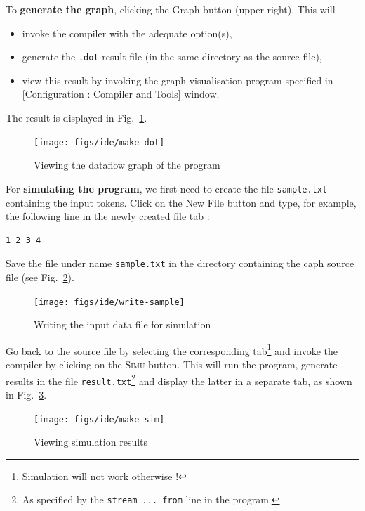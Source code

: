 \medskip
To \textbf{generate the graph}, clicking the \textsf{Graph} button (upper right). This will
\begin{itemize}
\item invoke the \caph compiler with the adequate option(s),
\item generate the \texttt{.dot} result file (in the same directory as the source file),
\item view this result by invoking the graph visualisation program specified in 
  [\textsf{Configuration : Compiler and Tools}] window.
\end{itemize}

The result is displayed in Fig.~\ref{fig:make-dot}.

\begin{figure}[h]
  \centering
  \texttt{[image: figs/ide/make-dot]}
  \caption{Viewing the dataflow graph of the program}
  \label{fig:make-dot}
\end{figure}

\medskip
For \textbf{simulating the program}, we first need to create the file \texttt{sample.txt} containing
the input tokens. Click on the \textsf{New File} button and type, for example, the following line in
the newly created file tab :

\begin{verbatim}
1 2 3 4
\end{verbatim}

Save the file under name \texttt{sample.txt} in the directory containing the caph source file (see
Fig.~\ref{fig:write-sample}).

\begin{figure}[h]
  \centering
  \texttt{[image: figs/ide/write-sample]}
  \caption{Writing the input data file for simulation}
  \label{fig:write-sample}
\end{figure}

Go back to the \caph source file by selecting the corresponding tab\footnote{Simulation will not
  work otherwise !}  and invoke the compiler by clicking on the \textsc{Simu} button. This will run
the program, generate results in the file \texttt{result.txt}\footnote{As specified by the
  \texttt{stream ... from} line in the program.} and display the latter in a separate tab, as shown
in Fig.~\ref{fig:make-sim}.

\begin{figure}[h]
  \centering
  \texttt{[image: figs/ide/make-sim]}
  \caption{Viewing simulation results}
  \label{fig:make-sim}
\end{figure}

